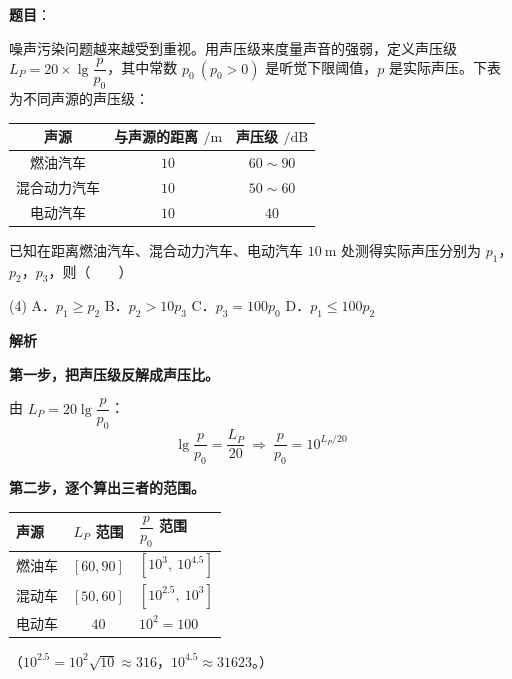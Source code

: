 \begin{answer}

\textbf{题目}：

噪声污染问题越来越受到重视。用声压级来度量声音的强弱，定义声压级 $L_P=20\times\lg\dfrac p{p_0}$，其中常数 $p_0\ (p_0>0)$ 是听觉下限阈值，$p$ 是实际声压。下表为不同声源的声压级：

\begin{center}
\begin{tabular}{ccc}
\toprule
声源 & 与声源的距离 $/\mathrm m$ & 声压级 $/\mathrm{dB}$ \\
\midrule
燃油汽车 & $10$ & $60\sim90$ \\
混合动力汽车 & $10$ & $50\sim60$ \\
电动汽车 & $10$ & $40$ \\
\bottomrule
\end{tabular}
\end{center}

已知在距离燃油汽车、混合动力汽车、电动汽车 $10\ \mathrm m$ 处测得实际声压分别为 $p_1$，$p_2$，$p_3$，则\mbox{（　　）}

\begin{gkopts}(4)
\task A．$p_1\ge p_2$
\task B．$p_2>10p_3$
\task C．$p_3=100p_0$
\task D．$p_1\le100p_2$
\end{gkopts}

\textbf{解析}

\textbf{第一步，把声压级反解成声压比。}

由 $L_P=20\lg\dfrac p{p_0}$：
\nopagebreak[4]
\[\lg\frac p{p_0}=\frac{L_P}{20}\ \Longrightarrow\ \frac p{p_0}=10^{L_P/20}\]

\textbf{第二步，逐个算出三者的范围。}

\begin{center}
\begin{tabular}{lcl}
\toprule
声源 & $L_P$ 范围 & $\dfrac p{p_0}$ 范围 \\
\midrule
燃油车 & $[60,90]$ & $\left[10^{3},\ 10^{4.5}\right]$ \\
混动车 & $[50,60]$ & $\left[10^{2.5},\ 10^{3}\right]$ \\
电动车 & $40$ & $10^{2}=100$ \\
\bottomrule
\end{tabular}
\end{center}

（$10^{2.5}=10^2\sqrt{10}\approx316$，$10^{4.5}\approx31623$。）

\par\medskip


\end{answer}
